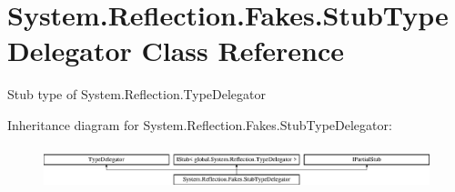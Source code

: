\hypertarget{class_system_1_1_reflection_1_1_fakes_1_1_stub_type_delegator}{\section{System.\-Reflection.\-Fakes.\-Stub\-Type\-Delegator Class Reference}
\label{class_system_1_1_reflection_1_1_fakes_1_1_stub_type_delegator}
}


Stub type of System.\-Reflection.\-Type\-Delegator 


Inheritance diagram for System.\-Reflection.\-Fakes.\-Stub\-Type\-Delegator\-:\begin{figure}[H]
\begin{center}
\leavevmode
\includegraphics[height=1.257015cm]{class_system_1_1_reflection_1_1_fakes_1_1_stub_type_delegator}
\end{center}
\end{figure}
